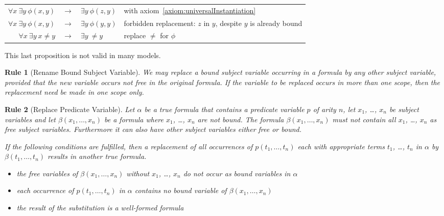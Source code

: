 \documentclass[a4paper,german,10pt,twoside]{book}
\newtheorem{rul}{Rule}
\theoremstyle{definition}
\theoremstyle{remark}
\begin{document}
\par
\begin{tabularx}{\linewidth}{rclX}
  $\forall x \ \exists y \ \phi(x, y)$ & $\rightarrow$ & $\exists y \ \phi(z,y)$ 
    & with axiom~\ref{axiom:universalInstantiation} \\
  $\forall x \ \exists y \ \phi(x, y)$ & $\rightarrow$ & $\exists y \ \phi(y,y)$ 
    & forbidden replacement: $z$ in $y$, despite $y$ is already bound \\
  $\forall x \ \exists y \ x \neq y$ & $\rightarrow$ & $\exists y \ \neq y$ 
    & replace $\neq$ for $\phi$
\end{tabularx}

\par
This last proposition is not valid in many models.


\par


\begin{rul}[Rename Bound Subject Variable]
\label{rule:renameBound} \hypertarget{rule:renameBound}{}
We may replace a bound subject variable occurring in a formula by any other subject variable, provided that the new variable occurs not free in the original formula.
If the variable to be replaced occurs in more than one scope, then the replacement need be made in one scope only.
\end{rul}




\par


\begin{rul}[Replace Predicate Variable]
\label{rule:replacePred} \hypertarget{rule:replacePred}{}
Let $\alpha$ be a true formula that contains a predicate variable $p$ of arity $n$, let $x_1$, \ldots, $x_n$ be subject variables and let
$\beta(x_1, \ldots, x_n)$ be a formula where $x_1$, \ldots, $x_n$ are not bound. The formula $\beta(x_1, \ldots, x_n)$ must not contain all $x_1$, \ldots, $x_n$ as free subject variables. Furthermore it can also have other subject variables either free or bound.

If the following conditions are fulfilled, then a replacement of all occurrences of $p(t_1, \ldots, t_n)$ each with appropriate terms $t_1$, \ldots, $t_n$ in $\alpha$ by $\beta(t_1, \ldots, t_n)$ results in another true formula.

\begin{itemize}

\item
the free variables of $\beta(x_1, \ldots, x_n)$ without $x_1$, \ldots, $x_n$ do not occur as bound variables in $\alpha$ 

\item 
each occurrence of $p(t_1, \ldots, t_n)$ in $\alpha$ contains no bound variable of $\beta(x_1, \ldots, x_n)$ 

\item
the result of the substitution is a well-formed formula

\end{itemize}
\end{rul}
\end{document}
